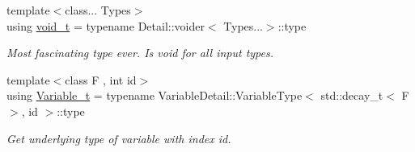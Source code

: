 \begin{DoxyCompactItemize}
{\footnotesize template$<$class... Types$>$ }\\using \hyperlink{namespacefuncy_a32da2ae6d9298793159777c02d9ddcfb}{void\-\_\-t} = typename Detail\-::voider$<$ Types...$>$\-::type
\begin{DoxyCompactList}\small\item\em Most fascinating type ever. Is void for all input types. \end{DoxyCompactList}\item 
{\footnotesize template$<$class F , int id$>$ }\\using \hyperlink{namespacefuncy_abb94be57bfb973aa11e5be3f37f7f608}{Variable\-\_\-t} = typename Variable\-Detail\-::\-Variable\-Type$<$ std\-::decay\-\_\-t$<$ F $>$, id $>$\-::type
\begin{DoxyCompactList}\small\item\em Get underlying type of variable with index id. \end{DoxyCompactList}\end{DoxyCompactItemize}
